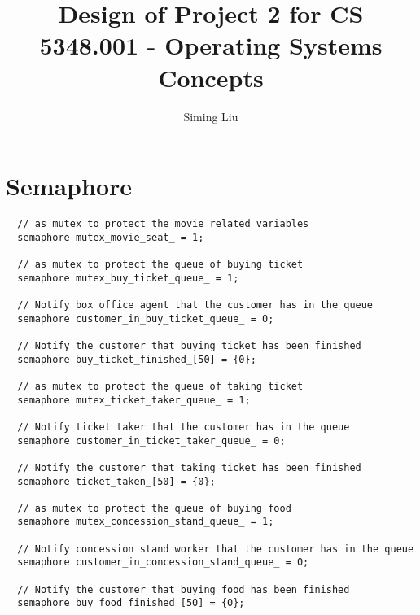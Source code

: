 \documentclass[a4paper]{report}
\begin{document}
\title{Design of Project 2 for CS 5348.001 - Operating Systems Concepts}

\author{Siming Liu}

\maketitle{}

\section*{Semaphore}
\begin{lstlisting}
  // as mutex to protect the movie related variables
  semaphore mutex_movie_seat_ = 1;

  // as mutex to protect the queue of buying ticket
  semaphore mutex_buy_ticket_queue_ = 1;

  // Notify box office agent that the customer has in the queue
  semaphore customer_in_buy_ticket_queue_ = 0;

  // Notify the customer that buying ticket has been finished
  semaphore buy_ticket_finished_[50] = {0};

  // as mutex to protect the queue of taking ticket
  semaphore mutex_ticket_taker_queue_ = 1;

  // Notify ticket taker that the customer has in the queue
  semaphore customer_in_ticket_taker_queue_ = 0;

  // Notify the customer that taking ticket has been finished
  semaphore ticket_taken_[50] = {0};

  // as mutex to protect the queue of buying food
  semaphore mutex_concession_stand_queue_ = 1;

  // Notify concession stand worker that the customer has in the queue
  semaphore customer_in_concession_stand_queue_ = 0;

  // Notify the customer that buying food has been finished
  semaphore buy_food_finished_[50] = {0};
\end{lstlisting}
\end{document}
